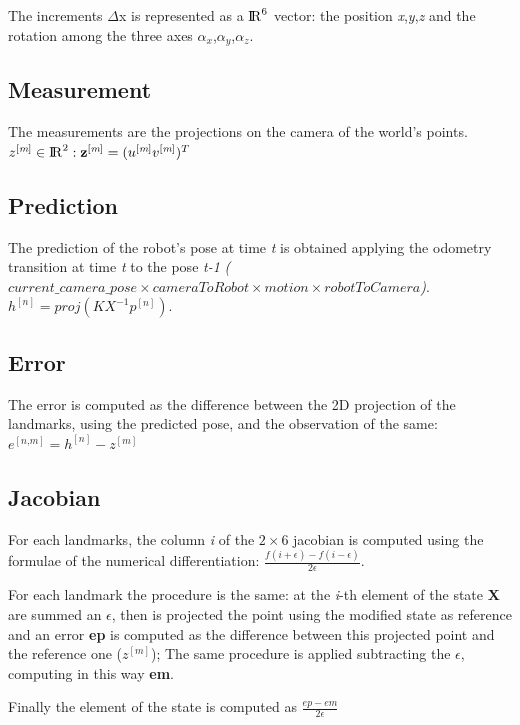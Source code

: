 \documentclass[10pt]{article}
\begin{document}
	The increments $\Delta$x is represented as a ${\rm I\!R}^6$ vector: the position \textit{x},\textit{y},\textit{z} and the rotation among the three axes \textit{$\alpha_x$},\textit{$\alpha_y$},\textit{$\alpha_z$}.
	
	\subsection{Measurement}
	The measurements are the projections on the camera of the world's points.
	$z^{[\textit{m}]} \in {\rm I\!R}^2 : \textbf{z}^{[\textit{m}]} = (u^{[\textit{m}]} v^{[\textit{m}]})^T$
	
	\subsection{Prediction}
	The prediction of the robot's pose at time \textit{t} is obtained applying the odometry transition at time \textit{t} to the pose \textit{t-1} \textit{($current\_camera\_pose \times cameraToRobot \times motion \times robotToCamera$)}. \\
	$h^{[\textit{n}]} = proj(K X^{-1} p^{[\textit{n}]})$.
	
	\subsection{Error}
	The error is computed as the difference between the 2D projection of the landmarks, using the predicted pose, and the observation of the same:\\
	$e^{[\textit{n,m}]} = h^{[\textit{n}]} - z^{[\textit{m}]}$
	
	\subsection{Jacobian}
	For each landmarks, the column \textit{i} of the $2\times6$ jacobian is computed using the formulae of the numerical differentiation: $ \frac{f(i +  \epsilon) - f(i-\epsilon)}{2\epsilon}$.
	
	For each landmark the procedure is the same: at the \textit{i}-th element of the state \textbf{X} are summed an $\epsilon$, then is projected the point using the modified state as reference and an error \textbf{ep} is computed as the difference between this projected point and the reference one ($z^{[\textit{m}]}$);
	The same procedure is applied subtracting the $\epsilon$, computing in this way \textbf{em}.
	
	Finally the element of the state is computed as $\frac{ep - em}{2\epsilon}$
	
\end{document}
